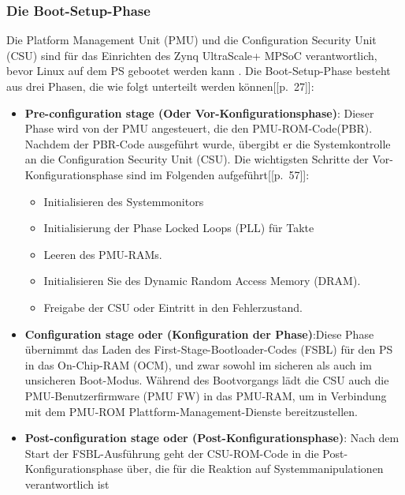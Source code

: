 \subsubsection{Die Boot-Setup-Phase}
\label{cha:tech_grund:sec:Komponente_eines_Emb_Lin_Sys:sub:sec:pmu}
Die Platform Management Unit (PMU) und die Configuration Security Unit (CSU) sind für das Einrichten des Zynq UltraScale+ MPSoC verantwortlich, bevor Linux auf dem PS gebootet werden kann . Die Boot-Setup-Phase besteht aus drei Phasen, die wie folgt unterteilt werden können[\cite{XilinxInc.2019}[p.~27]]:
\begin{itemize}
	\item \textbf{Pre-configuration stage (Oder Vor-Konfigurationsphase)}: Dieser Phase wird von der PMU angesteuert, die den PMU-ROM-Code(PBR). Nachdem der PBR-Code ausgeführt wurde, übergibt er die Systemkontrolle an die Configuration Security Unit (CSU). Die wichtigsten Schritte der Vor-Konfigurationsphase sind im Folgenden aufgeführt[\cite{XilinxInc.2019}[p.~57]]:
	\begin{itemize}
		\item Initialisieren des Systemmonitors
		\item Initialisierung der Phase Locked Loops (PLL) für Takte
		\item Leeren des PMU-RAMs.
		\item Initialisieren Sie des Dynamic Random Access Memory (DRAM).
		\item Freigabe der CSU oder Eintritt in den Fehlerzustand.
	\end{itemize}
	\item \textbf{Configuration stage oder (Konfiguration der Phase)}:Diese Phase übernimmt das Laden des First-Stage-Bootloader-Codes (FSBL) für den PS in das On-Chip-RAM (OCM), und zwar sowohl im sicheren als auch im unsicheren Boot-Modus. Während des Bootvorgangs lädt die CSU auch die PMU-Benutzerfirmware (PMU FW) in das PMU-RAM, um in Verbindung mit dem PMU-ROM Plattform-Management-Dienste bereitzustellen.
	\item \textbf{Post-configuration stage oder (Post-Konfigurationsphase)}: Nach dem Start der FSBL-Ausführung geht der CSU-ROM-Code in die Post-Konfigurationsphase über, die für die Reaktion auf Systemmanipulationen verantwortlich ist
\end{itemize}

